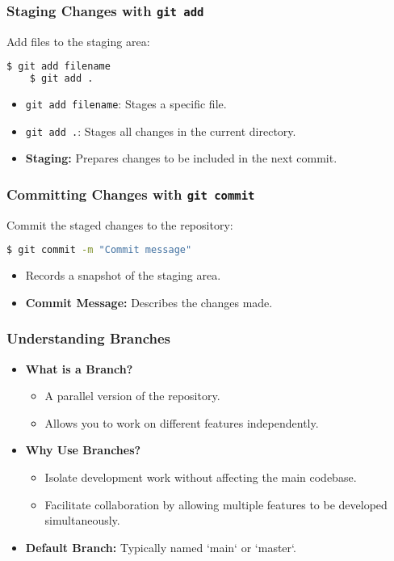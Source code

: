 \begin{frame}[fragile]
	\frametitle{Staging Changes with \texttt{git add}}
	Add files to the staging area:
	\begin{lstlisting}[language=bash]
	$ git add filename
	$ git add .
	\end{lstlisting}
	\begin{itemize}
		\item \texttt{git add filename}: Stages a specific file.
		\item \texttt{git add .}: Stages all changes in the current directory.
		\item \textbf{Staging:} Prepares changes to be included in the next commit.
	\end{itemize}
\end{frame}

\begin{frame}[fragile]
	\frametitle{Committing Changes with \texttt{git commit}}
	Commit the staged changes to the repository:
	\begin{lstlisting}[language=bash]
	$ git commit -m "Commit message"
	\end{lstlisting}
	\begin{itemize}
		\item Records a snapshot of the staging area.
		\item \textbf{Commit Message:} Describes the changes made.
	\end{itemize}
\end{frame}


\begin{frame}
	\frametitle{Understanding Branches}
	\begin{itemize}
		\item \textbf{What is a Branch?}
		\begin{itemize}
			\item A parallel version of the repository.
			\item Allows you to work on different features independently.
		\end{itemize}
		\item \textbf{Why Use Branches?}
		\begin{itemize}
			\item Isolate development work without affecting the main codebase.
			\item Facilitate collaboration by allowing multiple features to be developed simultaneously.
		\end{itemize}
		\item \textbf{Default Branch:} Typically named `main` or `master`.
	\end{itemize}
\end{frame}

